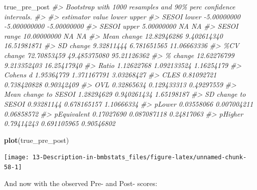 \documentclass[
]{book}
\newenvironment{Shaded}{\begin{snugshade}}{\end{snugshade}}
\newcommand{\CommentTok}[1]{\textcolor[rgb]{0.56,0.35,0.01}{\textit{#1}}}
\newcommand{\KeywordTok}[1]{\textcolor[rgb]{0.13,0.29,0.53}{\textbf{#1}}}
\newcommand{\NormalTok}[1]{#1}
\begin{document}
\begin{Shaded}
\begin{Highlighting}[]
\NormalTok{true\_pre\_post}
\CommentTok{\#> Bootstrap with 1000 resamples and 90\% perc confidence intervals.}
\CommentTok{\#> }
\CommentTok{\#>             estimator       value        lower       upper}
\CommentTok{\#>           SESOI lower {-}5.00000000 {-}5.000000000 {-}5.00000000}
\CommentTok{\#>           SESOI upper  5.00000000           NA          NA}
\CommentTok{\#>           SESOI range 10.00000000           NA          NA}
\CommentTok{\#>           Mean change 12.82946286  9.402614340 16.51981871}
\CommentTok{\#>             SD change  9.32811444  6.781651565 11.06663336}
\CommentTok{\#>            \%CV change 72.70853459 49.485375080 95.21126362}
\CommentTok{\#>              \% change 12.62276799  9.213352403 16.25417940}
\CommentTok{\#>                 Ratio  1.12622768  1.092133524  1.16254179}
\CommentTok{\#>             Cohen\textquotesingle{}s d  1.95364779  1.371167791  3.03268427}
\CommentTok{\#>                  CLES  0.81092721  0.738420828  0.90342409}
\CommentTok{\#>                   OVL  0.32865634  0.129433313  0.49297559}
\CommentTok{\#>  Mean change to SESOI  1.28294629  0.940261434  1.65198187}
\CommentTok{\#>    SD change to SESOI  0.93281144  0.678165157  1.10666334}
\CommentTok{\#>                pLower  0.03558066  0.007004211  0.06858572}
\CommentTok{\#>           pEquivalent  0.17027690  0.087087118  0.24817063}
\CommentTok{\#>               pHigher  0.79414243  0.691105965  0.90546802}
\end{Highlighting}
\end{Shaded}

\begin{Shaded}
\begin{Highlighting}[]
\KeywordTok{plot}\NormalTok{(true\_pre\_post)}
\end{Highlighting}
\end{Shaded}

\begin{center}\texttt{[image: 13-Description-in-bmbstats\_files/figure-latex/unnamed-chunk-58-1]} \end{center}

And now with the observed Pre- and Post- scores:
\end{document}
